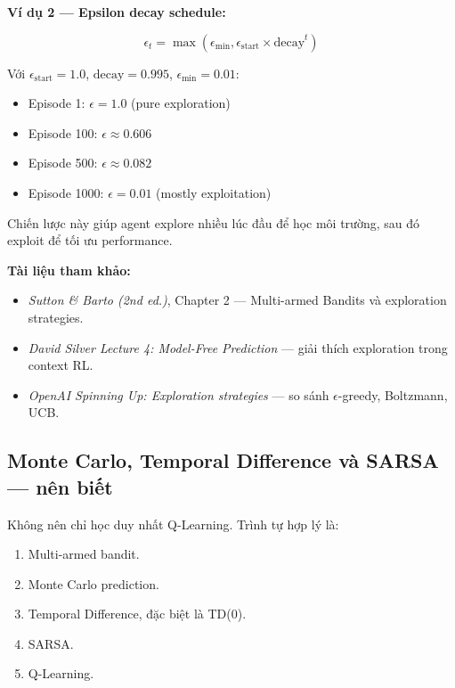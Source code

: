\documentclass[12pt,a4paper]{article}
\begin{document}
\textbf{Ví dụ 2 --- Epsilon decay schedule:}

\begin{equation}
\epsilon_t = \max(\epsilon_{\min}, \epsilon_{\text{start}} \times \text{decay}^t)
\end{equation}

Với $\epsilon_{\text{start}}=1.0$, $\text{decay}=0.995$, $\epsilon_{\min}=0.01$:
\begin{itemize}[leftmargin=1.5em]
    \item Episode 1: $\epsilon=1.0$ (pure exploration)
    \item Episode 100: $\epsilon \approx 0.606$
    \item Episode 500: $\epsilon \approx 0.082$
    \item Episode 1000: $\epsilon = 0.01$ (mostly exploitation)
\end{itemize}

Chiến lược này giúp agent explore nhiều lúc đầu để học môi trường, sau đó exploit để tối ưu performance.

\textbf{Tài liệu tham khảo:}
\begin{itemize}[leftmargin=1.5em]
    \item \textit{Sutton \& Barto (2nd ed.)}, Chapter 2 --- Multi-armed Bandits và exploration strategies.
    \item \textit{David Silver Lecture 4: Model-Free Prediction} --- giải thích exploration trong context RL.
    \item \textit{OpenAI Spinning Up: Exploration strategies} --- so sánh $\epsilon$-greedy, Boltzmann, UCB.
\end{itemize}

\subsection{Monte Carlo, Temporal Difference và SARSA --- nên biết}

Không nên chỉ học duy nhất Q-Learning. Trình tự hợp lý là:

\begin{enumerate}[leftmargin=1.8em]
    \item Multi-armed bandit.
    \item Monte Carlo prediction.
    \item Temporal Difference, đặc biệt là TD(0).
    \item SARSA.
    \item Q-Learning.
\end{enumerate}
\end{document}
